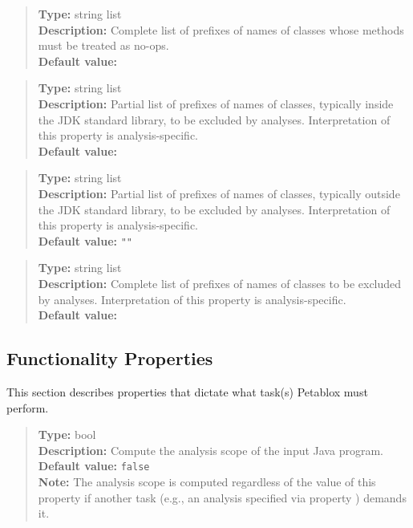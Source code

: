\begin{quote}
{\bf Type:} string list \\
{\bf Description:} Complete list of prefixes of names of classes whose methods must be treated as no-ops. \\
{\bf Default value:} 
\end{quote}

\begin{quote}
{\bf Type:} string list \\
{\bf Description:} Partial list of prefixes of names of classes, typically inside the JDK standard library, to be excluded by analyses.  Interpretation of this property is analysis-specific. \\
{\bf Default value:} 
\end{quote}

\begin{quote}
{\bf Type:} string list \\
{\bf Description:} Partial list of prefixes of names of classes, typically outside the JDK standard library, to be excluded by analyses.  Interpretation of this property is analysis-specific. \\
{\bf Default value:} {\tt ""}
\end{quote}

\begin{quote}
{\bf Type:} string list \\
{\bf Description:} Complete list of prefixes of names of classes to be excluded by analyses.  Interpretation of this property is analysis-specific. \\
{\bf Default value:} 
\end{quote}

\subsection{Functionality Properties}
\label{sec:func-props}

This section describes properties that dictate what task(s) Petablox must perform.

\begin{quote}
{\bf Type:} bool \\
{\bf Description:} Compute the analysis scope of the input Java program. \\
{\bf Default value:} {\tt false} \\
{\bf Note:} The analysis scope is computed regardless of the value of this property if another task (e.g., an analysis specified via property ) demands it.
\end{quote}

